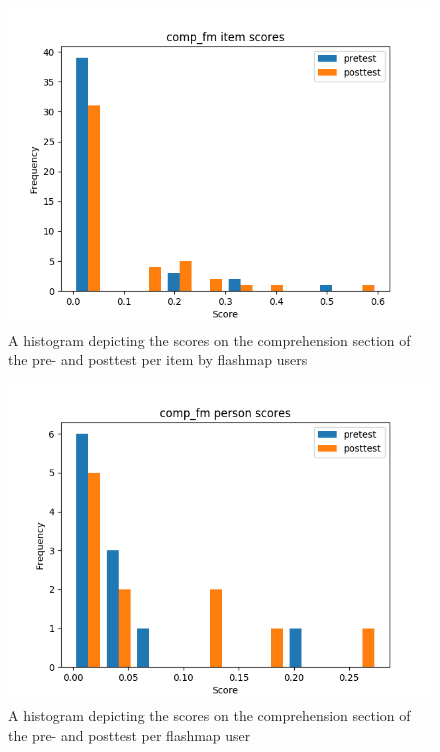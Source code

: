 \begin{figure}
    \centering
    \includegraphics[width=.7\textwidth]{img/comp_fm_diff.png}
    \caption{A histogram depicting the scores on the comprehension section of the pre- and posttest per item by flashmap users}
    \label{fig:comp_fm_diff}
\end{figure}
\begin{figure}
    \centering
    \includegraphics[width=.7\textwidth]{img/comp_fm_abil.png}
    \caption{A histogram depicting the scores on the comprehension section of the pre- and posttest per flashmap user}
    \label{fig:comp_fm_abil}
\end{figure}

